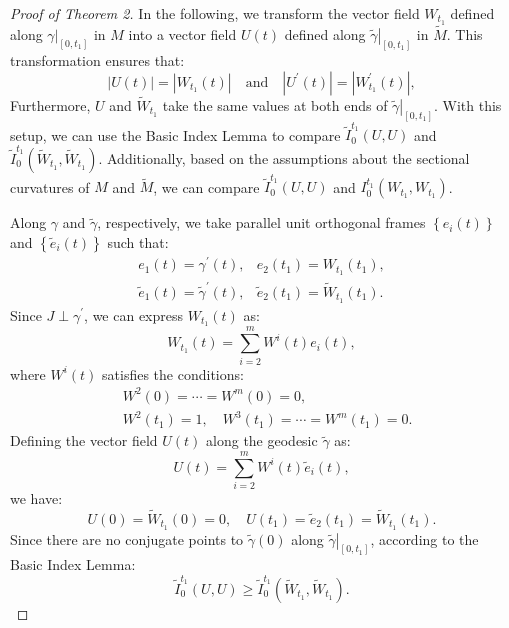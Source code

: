 \documentclass{ctexart}
\begin{document}
\begin{proof}[Proof of Theorem 2]
  In the following, we transform the vector field $W_{t_1}$ defined along $\left.\gamma\right|_{\left[0, t_1\right]}$ in $M$ 
  into a vector field $U(t)$ defined along $\left.\tilde{\gamma}\right|_{\left[0, t_1\right]}$ in $\tilde{M}$. This transformation ensures that:
  $$
  |U(t)| = \left|W_{t_1}(t)\right| \quad \text{and} \quad \left|U^{\prime}(t)\right| = \left|W_{t_1}^{\prime}(t)\right|,
  $$
  Furthermore, $U$ and $\tilde{W}_{t_1}$ take the same values at both ends of $\left.\tilde{\gamma}\right|_{\left[0, t_1\right]}$. With this setup, 
  we can use the Basic Index Lemma to compare $\tilde{I}_0^{t_1}(U, U)$ and $\tilde{I}_0^{t_1}\left(\tilde{W}_{t_1}, \tilde{W}_{t_1}\right)$. 
  Additionally, based on the assumptions about the sectional curvatures of $M$ and $\tilde{M}$, we can compare $\tilde{I}_0^{t_1}(U, U)$ and $I_0^{t_1}\left(W_{t_1}, W_{t_1}\right)$.

  Along $\gamma$ and $\tilde{\gamma}$, respectively, we take parallel unit orthogonal frames $\left\{e_i(t)\right\}$ and $\left\{\tilde{e}_i(t)\right\}$ such that:
  $$
  \begin{array}{ll}
  e_1(t)=\gamma^{\prime}(t), & e_2\left(t_1\right)=W_{t_1}\left(t_1\right), \\
  \tilde{e}_1(t)=\tilde{\gamma}^{\prime}(t), & \tilde{e}_2\left(t_1\right)=\tilde{W}_{t_1}\left(t_1\right).
  \end{array}
  $$
  Since $J \perp \gamma^{\prime}$, we can express $W_{t_1}(t)$ as:
  $$
  W_{t_1}(t)=\sum_{i=2}^m W^i(t) e_i(t),
  $$
  where $W^i(t)$ satisfies the conditions:
  $$
  \begin{aligned}
  & W^2(0)=\cdots=W^m(0)=0, \\
  & W^2\left(t_1\right)=1, \quad W^3\left(t_1\right)=\cdots=W^m\left(t_1\right)=0.
  \end{aligned}
  $$
  Defining the vector field $U(t)$ along the geodesic $\tilde{\gamma}$ as:
  $$
  U(t)=\sum_{i=2}^m W^i(t) \tilde{e}_i(t),
  $$
  we have:
  $$
  U(0)=\tilde{W}_{t_1}(0)=0, \quad U\left(t_1\right)=\tilde{e}_2\left(t_1\right)=\tilde{W}_{t_1}\left(t_1\right).
  $$
  Since there are no conjugate points to $\tilde{\gamma}(0)$ along $\left.\tilde{\gamma}\right|_{\left[0, t_1\right]}$, according to the Basic Index Lemma:
  \begin{equation}
    \tilde{I}_0^{t_1}(U, U) \geq \tilde{I}_0^{t_1}\left(\tilde{W}_{t_1}, \tilde{W}_{t_1}\right).
  \end{equation}


\end{proof}
\end{document}
